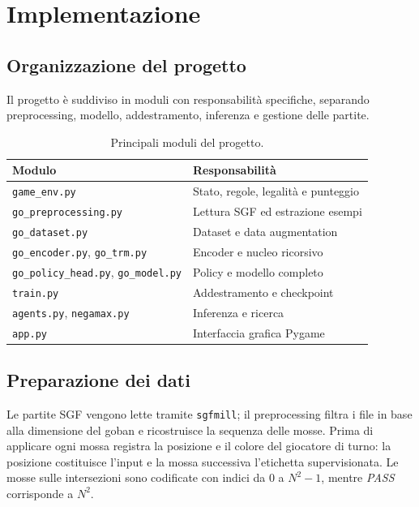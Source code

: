\section{Implementazione}

\subsection{Organizzazione del progetto}

Il progetto è suddiviso in moduli con responsabilità specifiche, separando preprocessing, modello, addestramento, inferenza e gestione delle partite.

\begin{table}[htbp]
    \centering
    \caption{Principali moduli del progetto.}
    \label{tab:project_modules}
    \begin{tabular}{lp{9cm}}
        \hline
        \textbf{Modulo} & \textbf{Responsabilità} \\
        \hline
        \texttt{game\_env.py} & Stato, regole, legalità e punteggio \\
        \texttt{go\_preprocessing.py} & Lettura SGF ed estrazione esempi \\
        \texttt{go\_dataset.py} & Dataset e data augmentation \\
        \texttt{go\_encoder.py}, \texttt{go\_trm.py} & Encoder e nucleo ricorsivo \\
        \texttt{go\_policy\_head.py}, \texttt{go\_model.py} & Policy e modello completo \\
        \texttt{train.py} & Addestramento e checkpoint \\
        \texttt{agents.py}, \texttt{negamax.py} & Inferenza e ricerca \\
        \texttt{app.py} & Interfaccia grafica Pygame \\
        \hline
    \end{tabular}
\end{table}

\subsection{Preparazione dei dati}

Le partite SGF vengono lette tramite \texttt{sgfmill}; il preprocessing filtra i file in base alla dimensione del goban e ricostruisce la sequenza delle mosse. Prima di applicare ogni mossa registra la posizione e il colore del giocatore di turno: la posizione costituisce l'input e la mossa successiva l'etichetta supervisionata. Le mosse sulle intersezioni sono codificate con indici da $0$ a $N^2-1$, mentre \textit{PASS} corrisponde a $N^2$.

